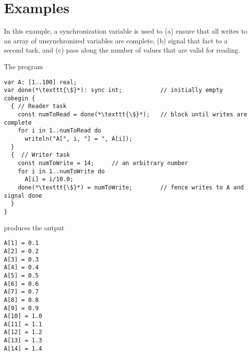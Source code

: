 \section{Examples}
\label{MCM_examples}
\begin{example}
  In this example, a synchronization variable is used to (a) ensure that
  all writes to an array of unsynchronized variables are complete, (b)
  signal that fact to a second task, and (c) pass along the number of
  values that are valid for reading.

  The program
\begin{chapel}
\begin{verbatim}
var A: [1..100] real;
var done(*\texttt{\$}*): sync int;           // initially empty
cobegin {
  { // Reader task
    const numToRead = done(*\texttt{\$}*);   // block until writes are complete
    for i in 1..numToRead do
      writeln("A[", i, "] = ", A[i]);
  }
  {  // Writer task
    const numToWrite = 14;     // an arbitrary number
    for i in 1..numToWrite do
      A[i] = i/10.0;
    done(*\texttt{\$}*) = numToWrite;        // fence writes to A and signal done
  }
}
\end{verbatim}
\end{chapel}
  produces the output
\begin{chapelprintoutput}
\begin{verbatim}
A[1] = 0.1
A[2] = 0.2
A[3] = 0.3
A[4] = 0.4
A[5] = 0.5
A[6] = 0.6
A[7] = 0.7
A[8] = 0.8
A[9] = 0.9
A[10] = 1.0
A[11] = 1.1
A[12] = 1.2
A[13] = 1.3
A[14] = 1.4
\end{verbatim}
\end{chapelprintoutput}
\end{example}


